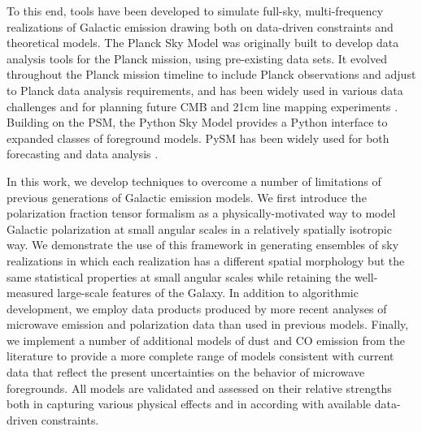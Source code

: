 \documentclass[twocolumn]{aastex631}
\newcommand{\giuse}[1]{\textcolor{orange}{(GP: #1)}}
\begin{document}
To this end, tools have been developed to simulate full-sky, multi-frequency realizations of Galactic emission drawing both on data-driven constraints and theoretical models. The Planck Sky Model \citep[PSM;][]{delabrouille2012} was originally built to develop data analysis tools for the Planck mission, using pre-existing data sets. It evolved throughout the Planck mission timeline to include Planck observations and adjust to Planck data analysis requirements, and has been widely used in various data challenges and for planning future CMB and 21cm line mapping experiments \citep[e.g.,][]{Remazeilles:2018, Fornazier:2022, Ghosh:2022}. Building on the PSM, the Python Sky Model \citep[PySM;][]{Thorne:2017} provides a Python interface to expanded classes of foreground models. PySM has been widely used for both forecasting \citep[e.g.,][]{Abazajian:2022, Hensley:2022, CCAT-PrimeCollaboration:2023, Wolz:2024} and data analysis \citep{Vacher:2023}.

In this work, we develop techniques to overcome a number of limitations of previous generations of Galactic emission models. We first introduce the polarization fraction tensor formalism as a physically-motivated way to model Galactic polarization at small angular scales in a relatively spatially isotropic way. We demonstrate the use of this framework in generating ensembles of sky realizations in which each realization has a different spatial morphology but the same statistical properties at small angular scales while retaining the well-measured large-scale features of the Galaxy. In addition to algorithmic development, we employ data products produced by more recent analyses of microwave emission and polarization data than used in previous models. Finally, we implement a number of additional models of dust and CO emission from the literature to provide a more complete range of models consistent with current data that reflect the present uncertainties on the behavior of microwave foregrounds. All models are validated and assessed on their relative strengths both in capturing various physical effects and in according with available data-driven constraints.

\end{document}
